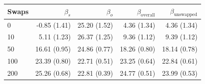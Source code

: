 \begin{table}[H]
\begin{tabular}{l rrrr}
\toprule
Swaps & $\beta_s$ & $\beta_o$ & $\beta_{\mathrm{overall}}$ & $\beta_{\mathrm{unswapped}}$ \\
\midrule
0 & -0.85 (1.41) & 25.20 (1.52) & 4.36 (1.34) & 4.36 (1.34) \\
10 & 5.11 (1.23) & 26.37 (1.25) & 9.36 (1.12) & 9.39 (1.12) \\
50 & 16.61 (0.95) & 24.86 (0.77) & 18.26 (0.80) & 18.14 (0.78) \\
100 & 23.39 (0.80) & 22.71 (0.51) & 23.25 (0.64) & 22.84 (0.61) \\
200 & 25.26 (0.68) & 22.81 (0.39) & 24.77 (0.51) & 23.99 (0.53) \\
\bottomrule
\end{tabular}
\end{table}

